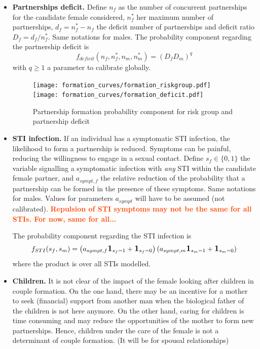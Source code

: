 \documentclass[11pt, onecolumn]{article}
\newcommand{\one}[1]{\textbf{\large{1}}_{#1}}
\newcommand{\warning}[1]{\textbf{\textcolor{OrangeRed}{#1}}}
\begin{document}
\begin{itemize}
\item \textbf{Partnerships deficit.} Define $n_f$ as the number of concurrent partnerships for the candidate female considered, $n^*_f$ her maximum number of partnerships, $d_f=n^*_f-n_f$ the deficit number of partnerships and deficit ratio $D_f=d_f/n^*_f$. Same notations for males. The probability component regarding the partnership deficit is
$$ f_{deficit}(n_f,n^*_f,n_m,n^*_m) = (D_f D_m)^q$$
with $q\geq 1$ a parameter to calibrate globally.

\begin{figure}[ht]
\centering
    \texttt{[image: formation\_curves/formation\_riskgroup.pdf]}
    \texttt{[image: formation\_curves/formation\_deficit.pdf]}
\caption{Partnership formation probability component for risk group and partnership deficit}
\label{fig:formationRiskDeficit}
\end{figure}

\item \textbf{STI infection.} If an individual has a symptomatic STI infection, the likelihood to form a partnership is reduced. Symptoms can be painful, reducing the willingness to engage in a sexual contact. Define $s_f\in\{0,1\}$ the variable signalling a symptomatic infection with \emph{any} STI within the candidate female partner, and $a_{sympt,f}$ the relative reduction of the probability that a partnership can be formed in the presence of these symptoms. Same notations for males. Values for parameters $a_{sympt}$ will have to be assumed (not calibrated). \warning{Repulsion of STI symptoms may not be the same for all STIs. For now, same for all...}

The probability component regarding the STI infection is
$$ f_{STI}(s_f,s_m)= \left(a_{sympt,f} \one{s_f=1} +\one{s_f=0}\right) \left(a_{sympt,m} \one{s_m=1} +\one{s_m=0}\right)$$
where the product is over all STIs modelled.


\item \textbf{Children.} It is not clear of the impact of the female looking after children in couple formation. On the one hand, there may be an incentive for a mother to seek (financial) support from another man when the biological father of the children is not here anymore. On the other hand, caring for children is time consuming and may reduce the opportunities of the mother to form new partnerships. Hence, children under the care of the female is not a determinant of couple formation. (It will be for spousal relationships)

\end{itemize}
\end{document}
